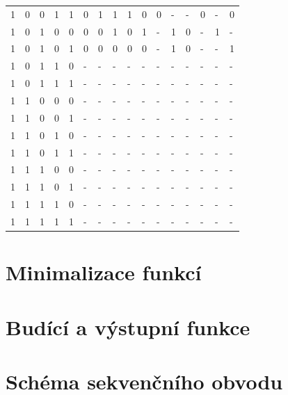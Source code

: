 \documentclass[titlepage]{article}
\begin{document}
\begin{center}
\begin{tabular}{|l|l|l|l|l|l|l|l|l|l|l|l|l|l|l|l|}
1 & 0 & 0 & 1 & 1 & 0 & 1 & 1 & 1 & 0 & 0 & - & - & 0 & - & 0 \\
1 & 0 & 1 & 0 & 0 & 0 & 0 & 1 & 0 & 1 & - & 1 & 0 & - & 1 & - \\
1 & 0 & 1 & 0 & 1 & 0 & 0 & 0 & 0 & 0 & - & 1 & 0 & - & - & 1 \\
1 & 0 & 1 & 1 & 0 & - & - & - & - & - & - & - & - & - & - & - \\
1 & 0 & 1 & 1 & 1 & - & - & - & - & - & - & - & - & - & - & - \\
1 & 1 & 0 & 0 & 0 & - & - & - & - & - & - & - & - & - & - & - \\
1 & 1 & 0 & 0 & 1 & - & - & - & - & - & - & - & - & - & - & - \\
1 & 1 & 0 & 1 & 0 & - & - & - & - & - & - & - & - & - & - & - \\
1 & 1 & 0 & 1 & 1 & - & - & - & - & - & - & - & - & - & - & - \\
1 & 1 & 1 & 0 & 0 & - & - & - & - & - & - & - & - & - & - & - \\
1 & 1 & 1 & 0 & 1 & - & - & - & - & - & - & - & - & - & - & - \\
1 & 1 & 1 & 1 & 0 & - & - & - & - & - & - & - & - & - & - & - \\
1 & 1 & 1 & 1 & 1 & - & - & - & - & - & - & - & - & - & - & - \\
\hline
\end{tabular}
\end{center}
\section{Minimalizace funkcí}
\section{Budící a výstupní funkce}
\section{Schéma sekvenčního obvodu}
\end{document}
